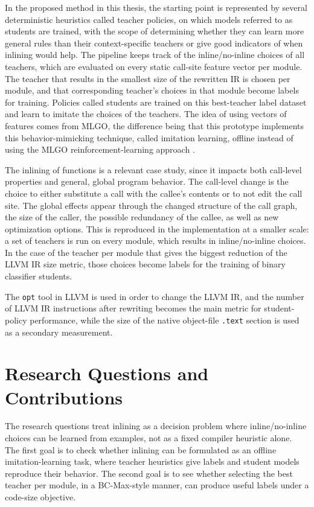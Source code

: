 \documentclass[12pt, a4paper]{report}
\begin{document}
In the proposed method in this thesis, the starting point is represented by
several deterministic heuristics called teacher policies, on which models
referred to as students are trained, with the scope of determining whether they
can learn more general rules than their context-specific teachers or give good
indicators of when inlining would help. The pipeline keeps track of the
inline/no-inline choices of all teachers, which are evaluated on every static
call-site feature vector per module. The teacher that results in the smallest
size of the rewritten IR is chosen per module, and that corresponding teacher's
choices in that module become labels for training. Policies called students are
trained on this best-teacher label dataset and learn to imitate the choices of
the teachers. The idea of using vectors of features comes from MLGO, the
difference being that this prototype implements this behavior-mimicking
technique, called imitation learning, offline instead of using the MLGO
reinforcement-learning approach
\cite{milepostgcc,mlgo,llvmmlgo,bcmax}.

The inlining of functions is a relevant case study, since it impacts both
call-level properties and general, global program behavior. The call-level
change is the choice to either substitute a call with the callee's contents or
to not edit the call site. The global effects appear through the changed
structure of the call graph, the size of the caller, the possible redundancy of
the callee, as well as new optimization options. This is reproduced in the
implementation at a smaller scale: a set of teachers is run on every module,
which results in inline/no-inline choices. In the case of the teacher per
module that gives the biggest reduction of the LLVM IR size metric, those
choices become labels for the training of binary classifier students.

The \texttt{opt} tool in LLVM is used in order to change the LLVM IR, and the
number of LLVM IR instructions after rewriting becomes the main metric for
student-policy performance, while the size of the native object-file
\texttt{.text} section is used as a secondary measurement.

\section{Research Questions and Contributions}

The research questions treat inlining as a decision problem where
inline/no-inline choices can be learned from examples, not as a fixed compiler
heuristic alone. The first goal is to check whether inlining can be formulated
as an offline imitation-learning task, where teacher heuristics give labels and
student models reproduce their behavior. The second goal is to see whether
selecting the best teacher per module, in a BC-Max-style manner, can produce
useful labels under a code-size objective.
\end{document}
